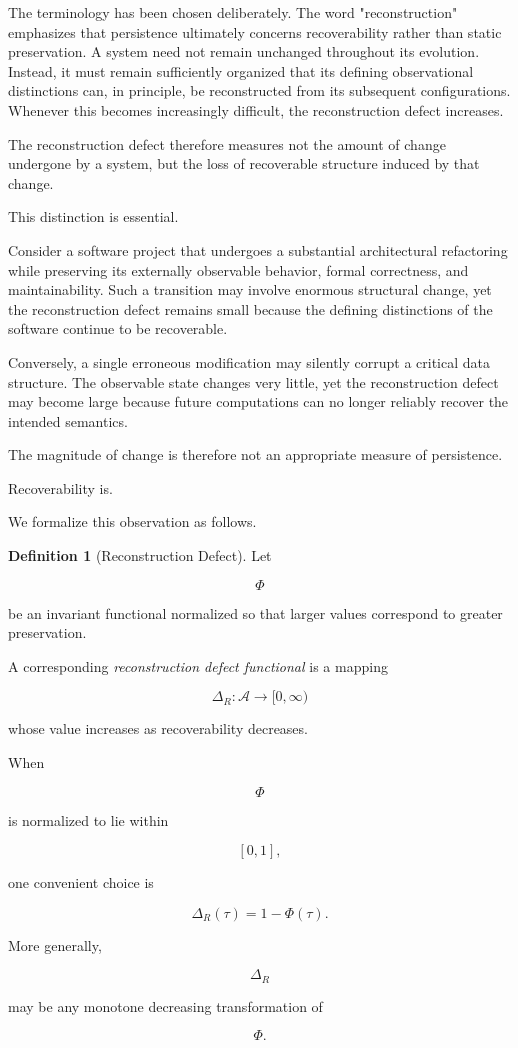 \documentclass[11pt]{book}
\numberwithin{equation}{chapter}
\theoremstyle{definition}
\newtheorem{definition}{Definition}[chapter]
\theoremstyle{plain}
\begin{document}
The terminology has been chosen deliberately. The word "reconstruction" emphasizes that persistence ultimately concerns recoverability rather than static preservation. A system need not remain unchanged throughout its evolution. Instead, it must remain sufficiently organized that its defining observational distinctions can, in principle, be reconstructed from its subsequent configurations. Whenever this becomes increasingly difficult, the reconstruction defect increases.

The reconstruction defect therefore measures not the amount of change undergone by a system, but the loss of recoverable structure induced by that change.

This distinction is essential.

Consider a software project that undergoes a substantial architectural refactoring while preserving its externally observable behavior, formal correctness, and maintainability. Such a transition may involve enormous structural change, yet the reconstruction defect remains small because the defining distinctions of the software continue to be recoverable.

Conversely, a single erroneous modification may silently corrupt a critical data structure. The observable state changes very little, yet the reconstruction defect may become large because future computations can no longer reliably recover the intended semantics.

The magnitude of change is therefore not an appropriate measure of persistence.

Recoverability is.

We formalize this observation as follows.

\begin{definition}[Reconstruction Defect]

Let

\[
\Phi
\]

be an invariant functional normalized so that larger values correspond to greater preservation.

A corresponding \emph{reconstruction defect functional} is a mapping

\[
\Delta_R:\mathcal A\rightarrow[0,\infty)
\]

whose value increases as recoverability decreases.

When

\[
\Phi
\]

is normalized to lie within

\[
[0,1],
\]

one convenient choice is

\[
\Delta_R(\tau)
=
1-\Phi(\tau).
\]

More generally,

\[
\Delta_R
\]

may be any monotone decreasing transformation of

\[
\Phi.
\]

\end{definition}
\end{document}

